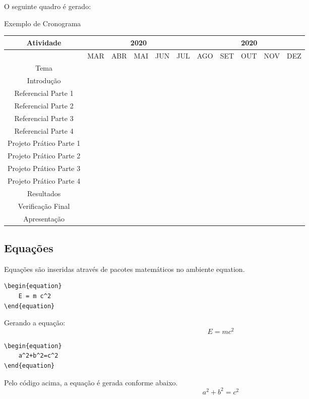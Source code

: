 O seguinte quadro é gerado:\\
\begin{quadro}[!htbp]
	\centering
	\caption{Exemplo de Cronograma}
		\begin{tabular}{|c|c|c|c|c|c|c|c|c|c|c|}
		\hline
		Atividade&\multicolumn{5}{c|}{2020}&\multicolumn{5}{c|}{2020}\\
		\hline
		&MAR&ABR&MAI&JUN&JUL&AGO&SET&OUT&NOV&DEZ\\
		\hline
		Tema&\cellcolor{blue}&&&&&&&&&\\
		\hline
		Introdução&&\cellcolor{yellow}&&&&&&&&\\
		\hline	
		Referencial Parte 1&&\cellcolor{red}&&&&&&&&\\
		\hline			
		Referencial Parte 2&&\cellcolor{green}&\cellcolor{green}&&&&&&&\\
		\hline	
		Referencial Parte 3&&&\cellcolor{blue}&&&&&&&\\
		\hline
		Referencial Parte 4&&&\cellcolor{red}&\cellcolor{red}&&&&&&\\
		\hline	
		Projeto Prático Parte 1&&&&\cellcolor{green}&\cellcolor{green}&&&&&\\
		\hline	
		Projeto Prático Parte 2&&&&\cellcolor{blue}&\cellcolor{blue}&&&&&\\
		\hline	
		Projeto Prático Parte 3&&&&&\cellcolor{yellow}&&&&&\\
		\hline	
		Projeto Prático Parte 4&&&&&&\cellcolor{red}&&&&\\
		\hline	
		Resultados&&&&&&\cellcolor{green}&\cellcolor{green}&\cellcolor{green}&&\\
		\hline	
		Verificação Final&&&&&&&&\cellcolor{blue}&\cellcolor{blue}&\\
		\hline	
		Apresentação&&&&&&&&\cellcolor{yellow}&\cellcolor{yellow}&\cellcolor{yellow}\\
		\hline	
		\end{tabular}
		\label{qua:cronograma}
\end{quadro}

\subsection{Equações}
\label{equacoes}

Equações são inseridas através de pacotes matemáticos no ambiente equation.
\begin{verbatim}
\begin{equation}
	E = m c^2
\end{equation}
\end{verbatim}
Gerando a equação:\\
\begin{equation}
    E = m c^2
\end{equation}
\begin{verbatim}
\begin{equation}
	a^2+b^2=c^2
\end{equation}
\end{verbatim}
Pelo código acima, a equação é gerada conforme abaixo.
\begin{equation}
    a^2+b^2=c^2
\end{equation}

